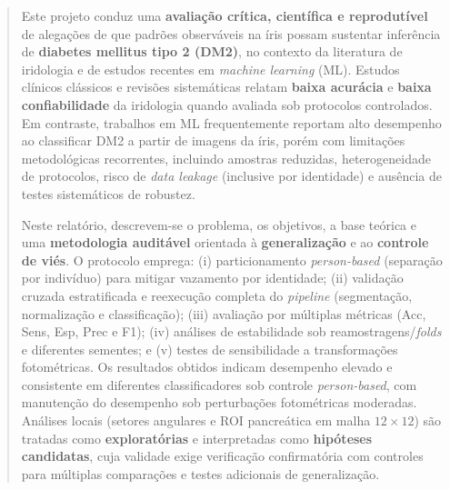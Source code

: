 \documentclass[11pt,a4paper]{article}
\begin{document}
\begin{abstract}
Este projeto conduz uma \textbf{avaliação crítica, científica e reprodutível} de alegações de que padrões observáveis na íris possam sustentar inferência de \textbf{diabetes mellitus tipo 2 (DM2)}, no contexto da literatura de iridologia e de estudos recentes em \textit{machine learning} (ML). Estudos clínicos clássicos e revisões sistemáticas relatam \textbf{baixa acurácia} e \textbf{baixa confiabilidade} da iridologia quando avaliada sob protocolos controlados. Em contraste, trabalhos em ML frequentemente reportam alto desempenho ao classificar DM2 a partir de imagens da íris, porém com limitações metodológicas recorrentes, incluindo amostras reduzidas, heterogeneidade de protocolos, risco de \textit{data leakage} (inclusive por identidade) e ausência de testes sistemáticos de robustez.

Neste relatório, descrevem-se o problema, os objetivos, a base teórica e uma \textbf{metodologia auditável} orientada à \textbf{generalização} e ao \textbf{controle de viés}. O protocolo emprega: (i) particionamento \textit{person-based} (separação por indivíduo) para mitigar vazamento por identidade; (ii) validação cruzada estratificada e reexecução completa do \textit{pipeline} (segmentação, normalização e classificação); (iii) avaliação por múltiplas métricas (Acc, Sens, Esp, Prec e F1); (iv) análises de estabilidade sob reamostragens/\textit{folds} e diferentes sementes; e (v) testes de sensibilidade a transformações fotométricas. Os resultados obtidos indicam desempenho elevado e consistente em diferentes classificadores sob controle \textit{person-based}, com manutenção do desempenho sob perturbações fotométricas moderadas. Análises locais (setores angulares e ROI pancreática em malha \(12\times 12\)) são tratadas como \textbf{exploratórias} e interpretadas como \textbf{hipóteses candidatas}, cuja validade exige verificação confirmatória com controles para múltiplas comparações e testes adicionais de generalização.
\end{abstract}


\tableofcontents
\newpage

\hypersetup{pageanchor=true}
\setcounter{page}{1}

\singlespacing

\end{document}

